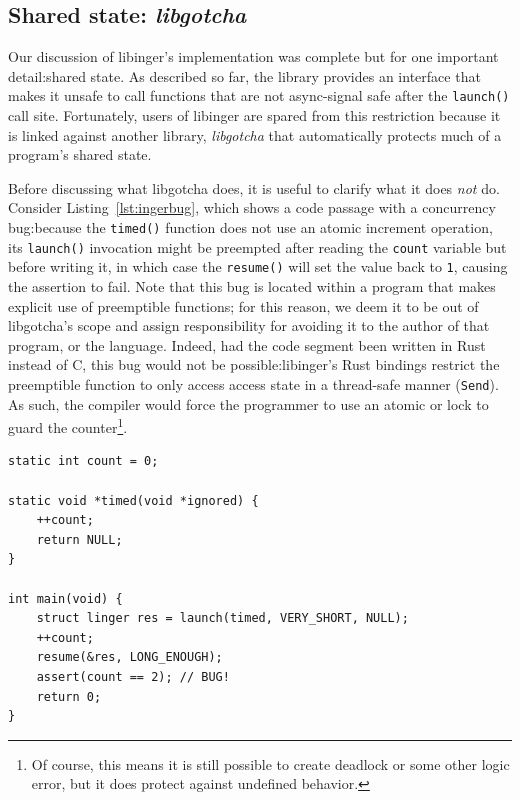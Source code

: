 \subsection{Shared state: \textit{libgotcha}}
\label{sec:libgotcha}

Our discussion of libinger's implementation was complete but for one important
detail:\@ shared state.  As described so far, the library provides an interface that
makes it unsafe to call functions that are not async-signal safe after the
\texttt{launch()} call site.  Fortunately, users of libinger are spared from this
restriction because it is linked against another library, \textit{libgotcha} that
automatically protects much of a program's shared state.

Before discussing what libgotcha does, it is useful to clarify what it does
\textit{not} do.  Consider Listing~\ref{lst:ingerbug}, which shows
a code passage with a concurrency bug:\@ because the \texttt{timed()} function does
not use an atomic increment operation, its \texttt{launch()} invocation might be
preempted after reading the \texttt{count} variable but before writing it, in which
case the \texttt{resume()} will set the value back to \texttt{1}, causing
the assertion to fail.  Note that this bug is located within a program that makes
explicit use of preemptible functions; for this reason, we deem it to be out of
libgotcha's scope and assign responsibility for avoiding it to the author of that
program, or the language.  Indeed, had the code segment been written in Rust instead
of C, this bug would not be possible:\@ libinger's Rust bindings restrict the
preemptible function to only access access state in a thread-safe manner
(\texttt{Send}).  As such, the compiler would force the programmer to use an atomic
or lock to guard the counter\footnote{Of course, this means it is still possible to
create deadlock or some other logic error, but it does protect against undefined
behavior.}.

\begin{lstlisting}[label=lst:ingerbug,caption=Concurrency bug in internal stateful code]
static int count = 0;

static void *timed(void *ignored) {
	++count;
	return NULL;
}

int main(void) {
	struct linger res = launch(timed, VERY_SHORT, NULL);
	++count;
	resume(&res, LONG_ENOUGH);
	assert(count == 2); // BUG!
	return 0;
}
\end{lstlisting}

